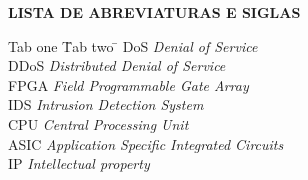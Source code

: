 %  
%  
%  
%   
\centerline{\textbf{LISTA DE ABREVIATURAS E SIGLAS}}

\vspace{0,75cm}

\begin{tabbing}
	Tab one \quad \=  Tab two \= \kill
	DoS \> \textit{Denial of Service} \\
	DDoS \>  \textit{Distributed Denial of Service}  \\
	FPGA \> \textit{ Field Programmable Gate Array}\\
	IDS \>  \textit{Intrusion Detection System}\\
	CPU \>  \textit{Central Processing Unit}\\
	ASIC \> \textit{Application Specific Integrated Circuits}\\
	IP \> \textit{Intellectual property}
	\\
\end{tabbing}


